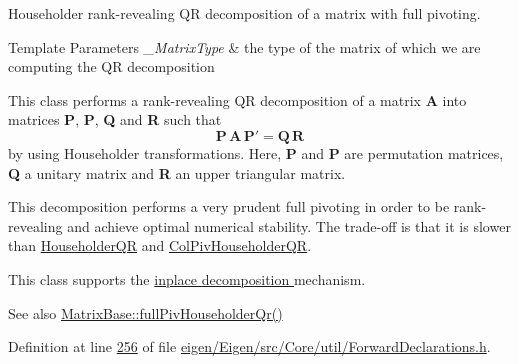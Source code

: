 Householder rank-\/revealing QR decomposition of a matrix with full pivoting. 


\begin{DoxyTemplParams}{Template Parameters}
{\em \+\_\+\+Matrix\+Type} & the type of the matrix of which we are computing the QR decomposition\\
\hline
\end{DoxyTemplParams}
This class performs a rank-\/revealing QR decomposition of a matrix {\bfseries A} into matrices {\bfseries P}, {\bfseries P\textquotesingle{}}, {\bfseries Q} and {\bfseries R} such that \[ \mathbf{P} \, \mathbf{A} \, \mathbf{P}' = \mathbf{Q} \, \mathbf{R} \] by using Householder transformations. Here, {\bfseries P} and {\bfseries P\textquotesingle{}} are permutation matrices, {\bfseries Q} a unitary matrix and {\bfseries R} an upper triangular matrix.

This decomposition performs a very prudent full pivoting in order to be rank-\/revealing and achieve optimal numerical stability. The trade-\/off is that it is slower than \hyperlink{group___q_r___module_class_eigen_1_1_householder_q_r}{Householder\+QR} and \hyperlink{group___q_r___module_class_eigen_1_1_col_piv_householder_q_r}{Col\+Piv\+Householder\+QR}.

This class supports the \hyperlink{group___inplace_decomposition}{inplace decomposition } mechanism.

\begin{DoxySeeAlso}{See also}
\hyperlink{group___core___module_a863bc0e06b641a089508eabec6835ab2}{Matrix\+Base\+::full\+Piv\+Householder\+Qr()} 
\end{DoxySeeAlso}


Definition at line \hyperlink{eigen_2_eigen_2src_2_core_2util_2_forward_declarations_8h_source_l00256}{256} of file \hyperlink{eigen_2_eigen_2src_2_core_2util_2_forward_declarations_8h_source}{eigen/\+Eigen/src/\+Core/util/\+Forward\+Declarations.\+h}.

